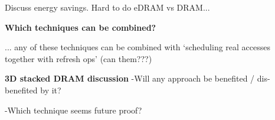 Discuss energy savings. Hard to do eDRAM vs DRAM...

\textbf{Which techniques can be combined?}

... any of these techniques can be combined with `scheduling real accesses together with refresh ops' (can them???)

\textbf{3D stacked DRAM discussion}
-Will any approach be benefited / dis-benefited by it?

-Which technique seems future proof?